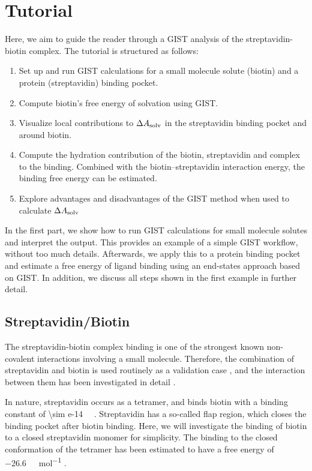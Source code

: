 \documentclass[9pt,tutorial]{livecoms}
\newcommand{\dasolv}{\Delta A_\textup{solv}}
\begin{document}
\pagebreak
\section{Tutorial}
Here, we aim to guide the reader through a GIST analysis of the streptavidin-biotin complex.
The tutorial is structured as follows:
\begin{enumerate}
	\item Set up and run GIST calculations for a small molecule solute (biotin) and a protein (streptavidin) binding pocket.
	\item Compute biotin's free energy of solvation using GIST.
	\item Visualize local contributions to $\dasolv$ in the streptavidin binding pocket and around biotin.
	\item Compute the hydration contribution of the biotin, streptavidin and complex to the binding. Combined with the biotin--streptavidin interaction energy, the binding free energy can be estimated.
	\item Explore advantages and disadvantages of the GIST method when used to calculate $\dasolv$
\end{enumerate}
In the first part, we show how to run GIST calculations for small molecule solutes and interpret the output. This provides an example of a simple GIST workflow, without too much details.
Afterwards, we apply this to a protein binding pocket and estimate a free energy of ligand binding using an end-states approach based on GIST. In addition, we discuss all steps shown in the first example in further detail. 


\subsection{Streptavidin/Biotin}
The streptavidin-biotin complex binding is one of the strongest known non-covalent interactions involving a small molecule.
Therefore, the combination of streptavidin and biotin is used routinely as a validation case \cite{Dundas2013-streptavidin-review}, and the interaction between them has been investigated in detail \cite{McConnell2021-biotin}.

\newcommand{\appr}{{\mathord{\sim}}}
In nature, streptavidin occurs as a tetramer, and binds biotin with a binding constant of \SI{\sim e-14}{\per\Molar} \cite{Dundas2013-streptavidin-review}.
Streptavidin has a so-called flap region, which closes the binding pocket after biotin binding.
Here, we will investigate the binding of biotin to a closed streptavidin monomer for simplicity.
The binding to the closed conformation of the tetramer has been estimated to have a free energy of \SI{-26.6}{\kilo\calorie\per\mol} \cite{Bansal2018-biotin}.
\end{document}
